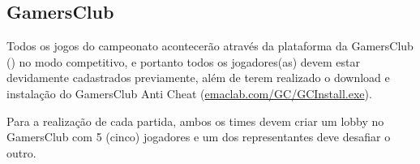 \subsection{GamersClub}

Todos os jogos do campeonato acontecerão através da plataforma da GamersClub () no modo competitivo, e portanto todos os jogadores(as) devem estar devidamente cadastrados previamente, além de terem realizado o download e instalação do GamersClub Anti Cheat (\url{emaclab.com/GC/GCInstall.exe}).

Para a realização de cada partida, ambos os times devem criar um lobby no GamersClub com 5 (cinco) jogadores e um dos representantes deve desafiar o outro.